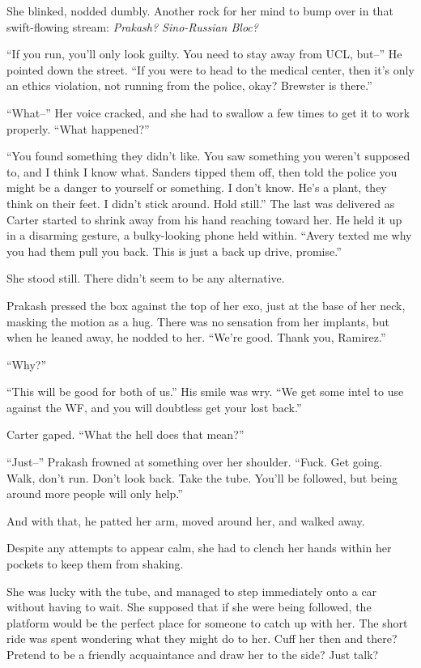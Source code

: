 She blinked, nodded dumbly. Another rock for her mind to bump over in that swift-flowing stream: \emph{Prakash? Sino-Russian Bloc?}

``If you run, you'll only look guilty. You need to stay away from UCL, but--'' He pointed down the street. ``If you were to head to the medical center, then it's only an ethics violation, not running from the police, okay? Brewster is there.''

``What--'' Her voice cracked, and she had to swallow a few times to get it to work properly. ``What happened?''

``You found something they didn't like. You saw something you weren't supposed to, and I think I know what. Sanders tipped them off, then told the police you might be a danger to yourself or something. I don't know. He's a plant, they think on their feet. I didn't stick around. Hold still.'' The last was delivered as Carter started to shrink away from his hand reaching toward her. He held it up in a disarming gesture, a bulky-looking phone held within. ``Avery texted me why you had them pull you back. This is just a back up drive, promise.''

She stood still. There didn't seem to be any alternative.

Prakash pressed the box against the top of her exo, just at the base of her neck, masking the motion as a hug. There was no sensation from her implants, but when he leaned away, he nodded to her. ``We're good. Thank you, Ramirez.''

``Why?''

``This will be good for both of us.'' His smile was wry. ``We get some intel to use against the WF, and you will doubtless get your lost back.''

Carter gaped. ``What the hell does that mean?''

``Just--'' Prakash frowned at something over her shoulder. ``Fuck. Get going. Walk, don't run. Don't look back. Take the tube. You'll be followed, but being around more people will only help.''

And with that, he patted her arm, moved around her, and walked away.

Despite any attempts to appear calm, she had to clench her hands within her pockets to keep them from shaking.

She was lucky with the tube, and managed to step immediately onto a car without having to wait. She supposed that if she were being followed, the platform would be the perfect place for someone to catch up with her. The short ride was spent wondering what they might do to her. Cuff her then and there? Pretend to be a friendly acquaintance and draw her to the side? Just talk?


